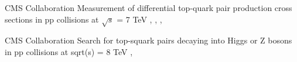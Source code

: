 

{CMS Collaboration}
{Measurement of differential top-quark pair production cross sections in pp collisions at $\sqrt{s}$ = 7 TeV}
{, , , }

{CMS Collaboration}
{Search for top-squark pairs decaying into Higgs or Z bosons in pp collisions at sqrt(s) = 8 TeV}
{, }

